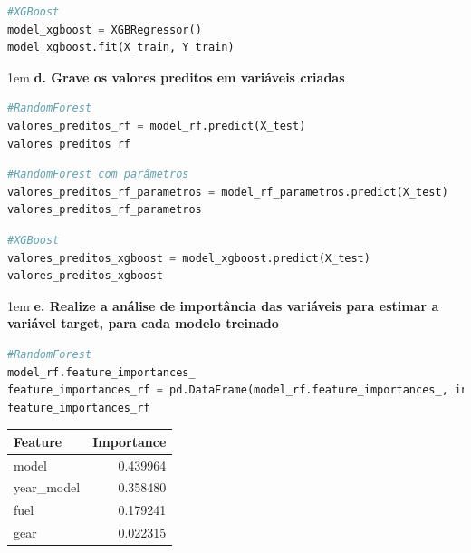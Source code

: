 \begin{lstlisting}[language=Python, style=input]
#XGBoost
model_xgboost = XGBRegressor()
model_xgboost.fit(X_train, Y_train)
\end{lstlisting}


\begin{adjustwidth}{1em}{}
\textbf{d. Grave os valores preditos em variáveis criadas}
\end{adjustwidth}
\begin{lstlisting}[language=Python, style=input]
#RandomForest
valores_preditos_rf = model_rf.predict(X_test)
valores_preditos_rf 
\end{lstlisting}

\begin{lstlisting}[language=Python, style=input]
#RandomForest com parâmetros
valores_preditos_rf_parametros = model_rf_parametros.predict(X_test)
valores_preditos_rf_parametros
\end{lstlisting}

\begin{lstlisting}[language=Python, style=input]
#XGBoost
valores_preditos_xgboost = model_xgboost.predict(X_test)
valores_preditos_xgboost
\end{lstlisting}

\begin{adjustwidth}{1em}{}
\textbf{e. Realize a análise de importância das variáveis para estimar a variável target, \textbf{para cada modelo treinado}}
\end{adjustwidth}
\begin{lstlisting}[language=Python, style=input]
#RandomForest
model_rf.feature_importances_
feature_importances_rf = pd.DataFrame(model_rf.feature_importances_, index = X_train.columns, columns=['importance']).sort_values('importance', ascending = False)
feature_importances_rf 
\end{lstlisting}
\begin{table}[H]
\centering
\begin{tcolorbox}[myoutputstyle]
\begin{tabular}{lr}
\hline
\textbf{Feature} & \textbf{Importance} \\
\hline
model      & 0.439964 \\
year\_model & 0.358480 \\
fuel       & 0.179241 \\
gear       & 0.022315 \\
\hline
\end{tabular}
\end{tcolorbox}
\end{table}


